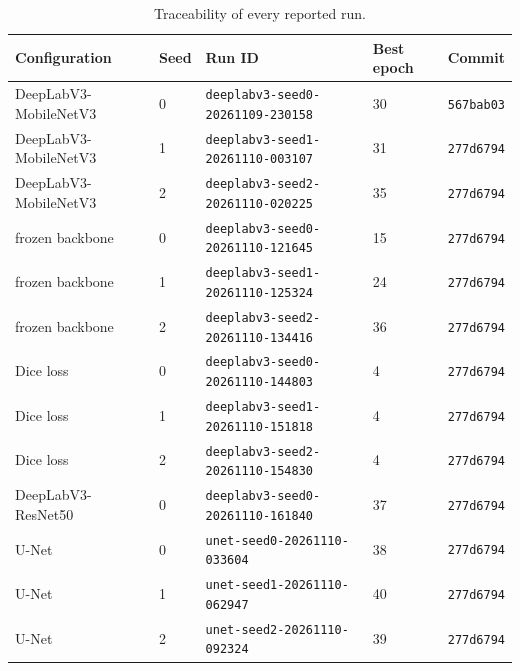 \documentclass[a4paper]{article}
\theoremstyle{definition}
\begin{document}
\begin{table}[H]
\centering
\caption{Traceability of every reported run.}
\label{tab:traceability}
\scriptsize
\begin{tabular}{llllr}
\hline
\textbf{Configuration} & \textbf{Seed} & \textbf{Run ID} & \textbf{Best epoch} & \textbf{Commit} \\
\hline
DeepLabV3-MobileNetV3 & 0 & \texttt{deeplabv3-seed0-20261109-230158} & 30 & \texttt{567bab03} \\
DeepLabV3-MobileNetV3 & 1 & \texttt{deeplabv3-seed1-20261110-003107} & 31 & \texttt{277d6794} \\
DeepLabV3-MobileNetV3 & 2 & \texttt{deeplabv3-seed2-20261110-020225} & 35 & \texttt{277d6794} \\
\quad frozen backbone & 0 & \texttt{deeplabv3-seed0-20261110-121645} & 15 & \texttt{277d6794} \\
\quad frozen backbone & 1 & \texttt{deeplabv3-seed1-20261110-125324} & 24 & \texttt{277d6794} \\
\quad frozen backbone & 2 & \texttt{deeplabv3-seed2-20261110-134416} & 36 & \texttt{277d6794} \\
\quad Dice loss       & 0 & \texttt{deeplabv3-seed0-20261110-144803} &  4 & \texttt{277d6794} \\
\quad Dice loss       & 1 & \texttt{deeplabv3-seed1-20261110-151818} &  4 & \texttt{277d6794} \\
\quad Dice loss       & 2 & \texttt{deeplabv3-seed2-20261110-154830} &  4 & \texttt{277d6794} \\
DeepLabV3-ResNet50    & 0 & \texttt{deeplabv3-seed0-20261110-161840} & 37 & \texttt{277d6794} \\
U-Net                 & 0 & \texttt{unet-seed0-20261110-033604}      & 38 & \texttt{277d6794} \\
U-Net                 & 1 & \texttt{unet-seed1-20261110-062947}      & 40 & \texttt{277d6794} \\
U-Net                 & 2 & \texttt{unet-seed2-20261110-092324}      & 39 & \texttt{277d6794} \\
\hline
\end{tabular}
\end{table}

\printbibliography
{}
\end{document}
